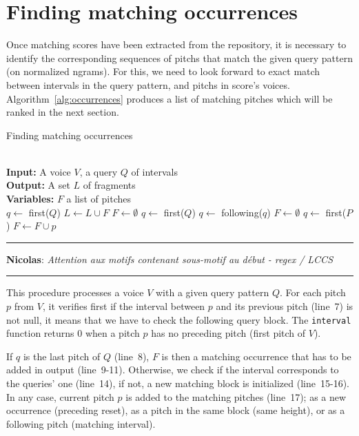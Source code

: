 \documentclass[letterpaper, 11pt]{article}
\newcommand{\remNT}[1]{%
\vspace*{0.1cm}
\hrule
\medskip
\noindent
\textbf{\textcolor{mygreen}{Nicolas}}: \textit{#1}
\medskip
\hrule
\vspace*{0.1cm}
}
\begin{document}
\section{Finding matching occurrences}\label{sec:highlight} 

Once matching scores have been extracted from the repository, it is necessary to identify the corresponding sequences of pitchs that match the given query pattern (on normalized ngrams).
For this, we need to look forward to exact match between intervals in the query pattern, and pitchs in score's voices.
Algorithm~\ref{alg:occurrences} produces a list of matching pitches which will be ranked in the next section.

\begin{algorithm}
	\caption{Finding matching occurrences\label{alg:occurrences}}
\begin{algorithmic}[1]
\\
\textbf{Input:} A voice $V$, a query $Q$ of intervals\\
\textbf{Output:} A set $L$ of fragments\\
\textbf{Variables:} $F$ a list of pitches\\
	\hspace*{1.9cm}$q \leftarrow$ first($Q$)
 
\State 			$L \leftarrow L \cup F$
\State 			$F \leftarrow \emptyset$
\State			$q \leftarrow$ first($Q$)
\Else{}
\State 			$q \leftarrow$ following($q$)
\State 				$F \leftarrow \emptyset$
\State			$q \leftarrow$ first($P$)
\EndIf
\EndIf
\State $F \leftarrow F \cup p$
\EndFor
\EndProcedure
\end{algorithmic}
\end{algorithm}

\remNT{Attention aux motifs contenant sous-motif au début - regex / LCCS}

This procedure processes a voice $V$ with a given query pattern $Q$.
For each pitch $p$ from $V$, it verifies first if the interval between $p$ and its previous pitch (line~7) is not null, it means that we have to check the following query block. The \texttt{interval} function returns 0 when a pitch $p$ has no preceding pitch (first pitch of $V$).

If $q$ is the last pitch of $Q$ (line~8), $F$ is then a matching occurrence that has to be added in output (line~9-11). Otherwise, we check if the interval corresponds to the queries' one (line~14), if not, a new matching block is initialized (line~15-16).
In any case, current pitch $p$ is added to the matching pitches (line~17); as a new occurrence (preceding reset), as a pitch in the same block (same height), or as a following pitch (matching interval).
\end{document}
